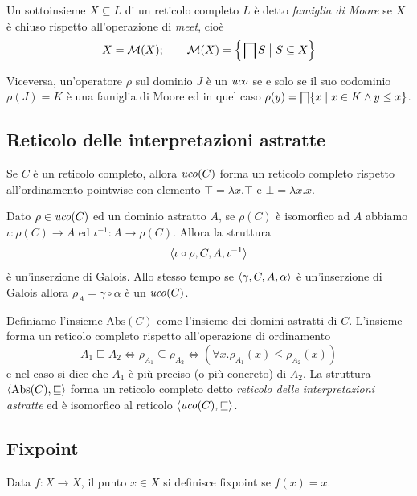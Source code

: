 \begin{definition}
Un sottoinsieme $X \subseteq L$ di un reticolo completo $L$ è detto \emph{famiglia di Moore} se $X$ è chiuso rispetto all'operazione di \emph{meet}, cioè
$$X = \mathcal{M}(X); \qquad \mathcal{M}(X) = \Big\{ \meet[S] \; \big| \; S \subseteq X \Big\}$$
\end{definition}

Viceversa, un'operatore $\rho$ sul dominio $J$ è un $\mathit{uco}$ se e solo se il suo codominio $\rho(J) = K$ è una famiglia di Moore ed in quel caso $\rho(y) = \meet[\{x \mid x \in K \land y \le x \}]$. 

\subsection{Reticolo delle interpretazioni astratte}

Se $C$ è un reticolo completo, allora $\mathit{uco}(C)$ forma un reticolo completo rispetto all'ordinamento pointwise con elemento $\top = \lambda x . \top$ e $\bot = \lambda x . x$. 

Dato $\rho \in \mathit{uco}(C)$ ed un dominio astratto $A$, se $\rho(C)$ è isomorfico ad $A$ abbiamo $\iota: \rho(C) \to A$ ed $\iota^{-1} : A \to \rho(C)$. Allora la struttura
\[ \langle \iota \circ \rho, C, A, \iota^{-1} \rangle \]
è un'inserzione di Galois. Allo stesso tempo se $\langle \gamma, C, A, \alpha \rangle$ è un'inserzione di Galois allora $\rho_{A} = \gamma \circ \alpha$ è un $\mathit{uco}(C)$.  

Definiamo l'insieme $\mathrm{Abs}(C)$ come l'insieme dei domini astratti di $C$. L'insieme forma un reticolo completo rispetto all'operazione di ordinamento
\[ A_1 \sqsubseteq A_2 
\iff \rho_{A_1} \subseteq \rho_{A_2} 
\iff \left( 
    \forall x . \rho_{A_1}(x) \le \rho_{A_2}(x)
\right) \]
e nel caso si dice che $A_1$ è più preciso (o più concreto) di $A_2$. La struttura $\langle \mathrm{Abs}(C), \sqsubseteq \rangle$ forma un reticolo completo detto \emph{reticolo delle interpretazioni astratte} ed è isomorfico al reticolo $\langle \mathit{uco}(C), \sqsubseteq \rangle$. 

\subsection{Fixpoint}\label{sec:fixpoint}

\begin{definition}
Data $f:X \to X$, il punto $x \in X$ si definisce fixpoint se $f(x) = x$.
\end{definition}

